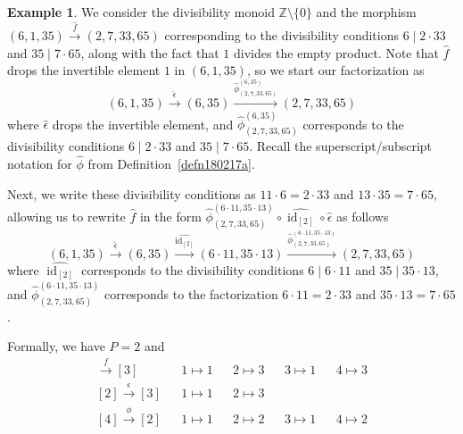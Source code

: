 \documentclass[reqno]{amsart}
\theoremstyle{plain}
\theoremstyle{definition}
\newtheorem{ex}[lem]{Example}
\newcommand{\id}{\operatorname{id}}
\newcommand{\bbz}{\mathbb{Z}}
\newcommand{\xra}{\xrightarrow}
\numberwithin{equation}{lem}
\begin{document}
\begin{ex}\label{ex170423a}
We consider the divisibility monoid $\bbz\setminus\{0\}$
and the morphism $(6,1,35)\xra{\hat f}(2,7,33,65)$ corresponding to the divisibility conditions
$6\mid 2\cdot 33$ and $35\mid 7\cdot 65$, along with the fact that $1$ divides the empty product.
Note that $\hat f$ drops the invertible element $1$ in $(6,1,35)$, so we start our factorization as
$$(6,1,35)\xra{\hat\epsilon}(6,35)\xra{\hat\phi^{(6,35)}_{(2,7,33,65)}}(2,7,33,65)$$
where $\hat\epsilon$ drops the invertible element, and $\hat\phi^{(6,35)}_{(2,7,33,65)}$ corresponds to the divisibility conditions
$6\mid 2\cdot 33$ and $35\mid 7\cdot 65$.
Recall the superscript/subscript notation for $\hat\phi$ from Definition~\ref{defn180217a}.

Next, we write these divisibility conditions as $11\cdot 6=2\cdot 33$ and $13\cdot 35=7\cdot 65$, 
allowing us to rewrite $\hat f$ in the form $\hat\phi^{(6\cdot 11,35\cdot 13)}_{(2,7,33,65)}\circ\widehat{\id_{[2]}}\circ\hat\epsilon$ as follows
$$(6,1,35)\xra{\hat\epsilon}(6,35)\xra{\widehat{\id_{[2]}}}(6\cdot 11,35\cdot 13)\xra{\hat\phi^{(6\cdot 11,35\cdot 13)}_{(2,7,33,65)}}(2,7,33,65)$$
where $\widehat{\id_{[2]}}$ corresponds to the divisibility conditions $6\mid 6\cdot 11$ and $35\mid 35\cdot 13$,
and $\hat\phi^{(6\cdot 11,35\cdot 13)}_{(2,7,33,65)}$ corresponds to the factorization $6\cdot 11=2\cdot 33$ and $35\cdot 13=7\cdot 65$.

Formally, we have $P=2$ and
\begin{align*}
[4]\xra{f}[3]
&&1\mapsto 1
&&2\mapsto 3
&&3\mapsto 1
&&4\mapsto 3
\\
[2]\xra{\epsilon}[3]
&&1\mapsto 1
&&2\mapsto 3
\\
[4]\xra{\phi}[2]
&&1\mapsto 1
&&2\mapsto 2
&&3\mapsto 1
&&4\mapsto 2
\end{align*}
\end{ex}
\end{document}
